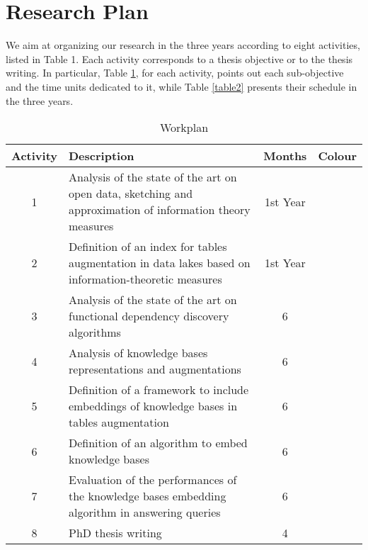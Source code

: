 \section{Research Plan}\label{researchplan}

We aim at organizing our research in the three years according to eight activities, listed in Table 1. Each activity corresponds to a thesis objective or to the thesis writing. In particular, Table \ref{table1}, for each activity, points out each sub-objective and the time units dedicated to it, while Table \ref{table2} presents their schedule in the three years.





\begin{table}[h!]\footnotesize
    \centering
    
    \caption{Workplan\label{table1}}
    \begin{tabular}{|c|p{9cm}|c|c|}
    \hline
    \textbf{Activity} & \textbf{Description} & \textbf{Months} & \textbf{Colour}\\ \hline
    1 & Analysis of the state of the art on open data, sketching and approximation of information theory measures & 1st Year & \cellcolor{lightgreen} \\\hline
    2 & Definition of an index for tables augmentation in data lakes based on information-theoretic measures& 1st Year & \cellcolor{green} \\\hline
    3 & Analysis of the state of the art on functional dependency discovery algorithms& 6 & \cellcolor{lightyellow} \\\hline
    4 & Analysis of knowledge bases representations and augmentations& 6 & \cellcolor{orange} \\\hline
    5 & Definition of a framework to include embeddings of knowledge bases in tables augmentation& 6 & \cellcolor{red} \\\hline
    6 & Definition of an algorithm to embed knowledge bases& 6 & \cellcolor{cyan} \\\hline
    7 & Evaluation of the performances of the knowledge bases embedding algorithm in answering queries& 6 & \cellcolor{blue} \\\hline
    8 & PhD thesis writing& 4 & \cellcolor{blue-violet} \\\hline
    \end{tabular}
    \end{table}
    

